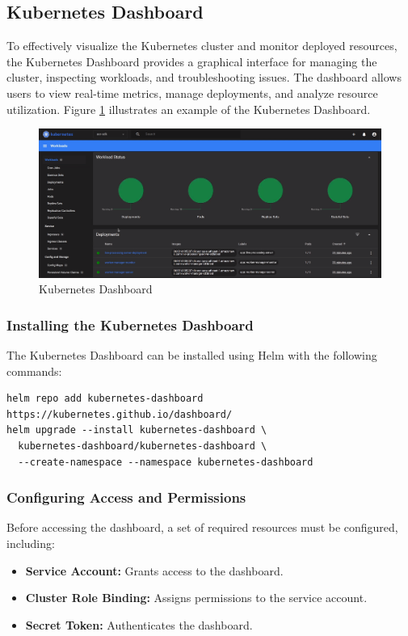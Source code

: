 \subsection{Kubernetes Dashboard}
To effectively visualize the Kubernetes cluster and monitor deployed resources, the Kubernetes Dashboard provides a graphical interface for managing the cluster, inspecting workloads, and troubleshooting issues. The dashboard allows users to view real-time metrics, manage deployments, and analyze resource utilization. Figure \ref{fig:kubernetes_dashboard} illustrates an example of the Kubernetes Dashboard.
\begin{figure}[ht]
  \centering
  \includegraphics[width=\textwidth]{figures/kubernetes_dashboard.png}
  \caption{Kubernetes Dashboard}
  \label{fig:kubernetes_dashboard}
\end{figure}

\subsubsection{Installing the Kubernetes Dashboard}
The Kubernetes Dashboard can be installed using Helm with the following commands:

\begin{verbatim}
helm repo add kubernetes-dashboard https://kubernetes.github.io/dashboard/
helm upgrade --install kubernetes-dashboard \
  kubernetes-dashboard/kubernetes-dashboard \
  --create-namespace --namespace kubernetes-dashboard
\end{verbatim}

\subsubsection{Configuring Access and Permissions}
Before accessing the dashboard, a set of required resources must be configured, including:

\begin{itemize}
  \item \textbf{Service Account:} Grants access to the dashboard.
  \item \textbf{Cluster Role Binding:} Assigns permissions to the service account.
  \item \textbf{Secret Token:} Authenticates the dashboard.
\end{itemize}

